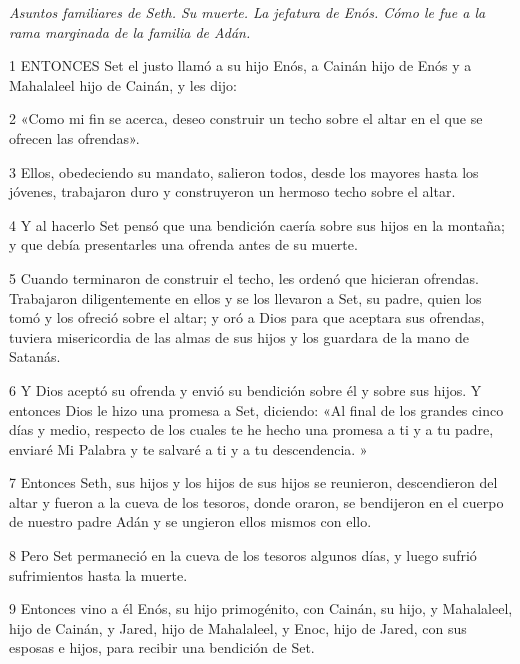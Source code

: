 \par \textit{Asuntos familiares de Seth. Su muerte. La jefatura de Enós. Cómo le fue a la rama marginada de la familia de Adán.}

\par 1 ENTONCES Set el justo llamó a su hijo Enós, a Cainán hijo de Enós y a Mahalaleel hijo de Cainán, y les dijo:

\par 2 «Como mi fin se acerca, deseo construir un techo sobre el altar en el que se ofrecen las ofrendas».

\par 3 Ellos, obedeciendo su mandato, salieron todos, desde los mayores hasta los jóvenes, trabajaron duro y construyeron un hermoso techo sobre el altar.

\par 4 Y al hacerlo Set pensó que una bendición caería sobre sus hijos en la montaña; y que debía presentarles una ofrenda antes de su muerte.

\par 5 Cuando terminaron de construir el techo, les ordenó que hicieran ofrendas. Trabajaron diligentemente en ellos y se los llevaron a Set, su padre, quien los tomó y los ofreció sobre el altar; y oró a Dios para que aceptara sus ofrendas, tuviera misericordia de las almas de sus hijos y los guardara de la mano de Satanás.

\par 6 Y Dios aceptó su ofrenda y envió su bendición sobre él y sobre sus hijos. Y entonces Dios le hizo una promesa a Set, diciendo: «Al final de los grandes cinco días y medio, respecto de los cuales te he hecho una promesa a ti y a tu padre, enviaré Mi Palabra y te salvaré a ti y a tu descendencia. »

\par 7 Entonces Seth, sus hijos y los hijos de sus hijos se reunieron, descendieron del altar y fueron a la cueva de los tesoros, donde oraron, se bendijeron en el cuerpo de nuestro padre Adán y se ungieron ellos mismos con ello.

\par 8 Pero Set permaneció en la cueva de los tesoros algunos días, y luego sufrió sufrimientos hasta la muerte.

\par 9 Entonces vino a él Enós, su hijo primogénito, con Cainán, su hijo, y Mahalaleel, hijo de Cainán, y Jared, hijo de Mahalaleel, y Enoc, hijo de Jared, con sus esposas e hijos, para recibir una bendición de Set.


